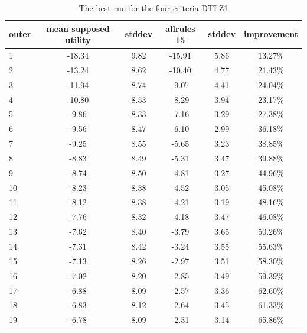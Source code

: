 \begin{table}[htb]
  \centering
  \begin{tabular}{l c c c c c}
    \hline
outer & mean supposed utility & stddev & allrules 15 & stddev & improvement \\
    \hline
    \hline
1 & -18.34 & 9.82 & -15.91 & 5.86 & 13.27\% \\
2 & -13.24 & 8.62 & -10.40 & 4.77 & 21.43\% \\
3 & -11.94 & 8.74 & -9.07 & 4.41 & 24.04\% \\
4 & -10.80 & 8.53 & -8.29 & 3.94 & 23.17\% \\
5 & -9.86 & 8.33 & -7.16 & 3.29 & 27.38\% \\
6 & -9.56 & 8.47 & -6.10 & 2.99 & 36.18\% \\
7 & -9.25 & 8.55 & -5.65 & 3.23 & 38.85\% \\
8 & -8.83 & 8.49 & -5.31 & 3.47 & 39.88\% \\
9 & -8.74 & 8.50 & -4.81 & 3.27 & 44.96\% \\
10 & -8.23 & 8.38 & -4.52 & 3.05 & 45.08\% \\
11 & -8.12 & 8.38 & -4.21 & 3.19 & 48.16\% \\
12 & -7.76 & 8.32 & -4.18 & 3.47 & 46.08\% \\
13 & -7.62 & 8.40 & -3.79 & 3.65 & 50.26\% \\
14 & -7.31 & 8.42 & -3.24 & 3.55 & 55.63\% \\
15 & -7.13 & 8.26 & -2.97 & 3.51 & 58.30\% \\
16 & -7.02 & 8.20 & -2.85 & 3.49 & 59.39\% \\
17 & -6.88 & 8.09 & -2.57 & 3.36 & 62.60\% \\
18 & -6.83 & 8.12 & -2.64 & 3.45 & 61.33\% \\
19 & -6.78 & 8.09 & -2.31 & 3.14 & 65.86\% \\
    \hline
  \end{tabular}
  \caption{The best run for the four-criteria DTLZ1}
  \label{t:un_best_2}
\end{table}



